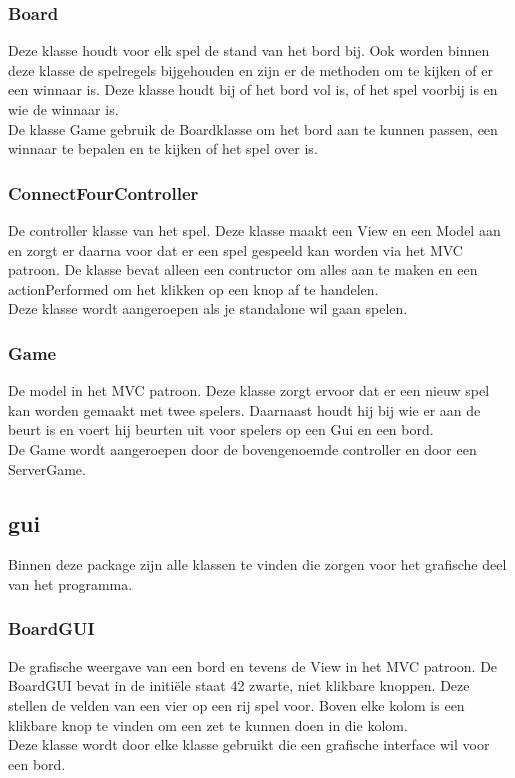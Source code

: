 \documentclass[12pt]{article}
\begin{document}
\subsubsection{Board}
Deze klasse houdt voor elk spel de stand van het bord bij. Ook worden binnen deze klasse de spelregels bijgehouden en zijn er de methoden om te kijken of er een winnaar is. Deze klasse houdt bij of het bord vol is, of het spel voorbij is en wie de winnaar is. \\
De klasse Game gebruik de Boardklasse om het bord aan te kunnen passen, een winnaar te bepalen en te kijken of het spel over is.

\subsubsection{ConnectFourController}
De controller klasse van het spel. Deze klasse maakt een View en een Model aan en zorgt er daarna voor dat er een spel gespeeld kan worden via het MVC patroon. De klasse bevat alleen een contructor om alles aan te maken en een actionPerformed om het klikken op een knop af te handelen.\\
Deze klasse wordt aangeroepen als je standalone wil gaan spelen.

\subsubsection{Game}
De model in het MVC patroon. Deze klasse zorgt ervoor dat er een nieuw spel kan worden gemaakt met twee spelers. Daarnaast houdt hij bij wie er aan de beurt is en voert hij beurten uit voor spelers op een Gui en een bord.\\
De Game wordt aangeroepen door de bovengenoemde controller en door een ServerGame. 

\subsection{gui}
Binnen deze package zijn alle klassen te vinden die zorgen voor het grafische deel van het programma.
\subsubsection{BoardGUI}
De grafische weergave van een bord en tevens de View in het MVC patroon. De BoardGUI bevat in de initi\"ele staat 42 zwarte, niet klikbare knoppen. Deze stellen de velden van een vier op een rij spel voor. Boven elke kolom is een klikbare knop te vinden om een zet te kunnen doen in die kolom.\\
Deze klasse wordt door elke klasse gebruikt die een grafische interface wil voor een bord.
\end{document}
